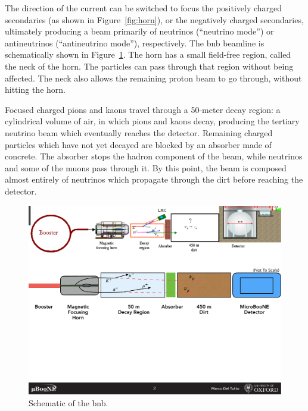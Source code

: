 The direction of the current can be switched to focus the positively charged secondaries (as shown in Figure~\ref{fig:horn}), or the negatively charged secondaries, ultimately producing a beam primarily of  neutrinos (``neutrino mode'') or antineutrinos (``antineutrino mode''), respectively. 
The \acrshort{bnb} beamline is schematically shown in Figure~\ref{fig:bnb}.
The horn has a small field-free region, called the neck of the horn. The particles can pass through that region without being affected. The neck also allows the remaining proton beam to go through, without hitting the horn.

Focused charged pions and kaons travel through a 50-meter decay region: a cylindrical volume of air, in which pions and kaons decay, producing the tertiary neutrino beam which eventually reaches the detector. 
Remaining charged particles which have not yet decayed are blocked by an absorber made of concrete. The absorber stops the hadron component of the beam, while neutrinos and some of the muons pass through it.
By this point, the beam is composed almost entirely of neutrinos which propagate through the dirt before reaching the detector. 

\begin{figure}[]
\centering
\includegraphics[width=1.0\textwidth]{images/MicroBooNE/bnb}
\caption[Booster Neutrino Beamline]{Schematic of the \acrlong{bnb}.}
\label{fig:bnb}
\end{figure}










